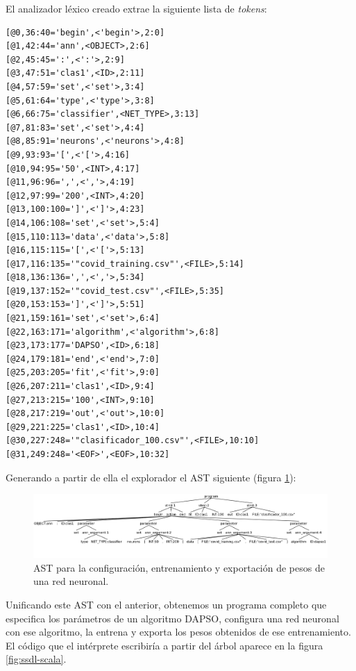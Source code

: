 El analizador léxico creado extrae la siguiente lista de \textit{tokens}:
\vspace{10pt}
\begin{lstlisting}[numbers=none]
[@0,36:40='begin',<'begin'>,2:0]
[@1,42:44='ann',<OBJECT>,2:6]
[@2,45:45=':',<':'>,2:9]
[@3,47:51='clas1',<ID>,2:11]
[@4,57:59='set',<'set'>,3:4]
[@5,61:64='type',<'type'>,3:8]
[@6,66:75='classifier',<NET_TYPE>,3:13]
[@7,81:83='set',<'set'>,4:4]
[@8,85:91='neurons',<'neurons'>,4:8]
[@9,93:93='[',<'['>,4:16]
[@10,94:95='50',<INT>,4:17]
[@11,96:96=',',<','>,4:19]
[@12,97:99='200',<INT>,4:20]
[@13,100:100=']',<']'>,4:23]
[@14,106:108='set',<'set'>,5:4]
[@15,110:113='data',<'data'>,5:8]
[@16,115:115='[',<'['>,5:13]
[@17,116:135='"covid_training.csv"',<FILE>,5:14]
[@18,136:136=',',<','>,5:34]
[@19,137:152='"covid_test.csv"',<FILE>,5:35]
[@20,153:153=']',<']'>,5:51]
[@21,159:161='set',<'set'>,6:4]
[@22,163:171='algorithm',<'algorithm'>,6:8]
[@23,173:177='DAPSO',<ID>,6:18]
[@24,179:181='end',<'end'>,7:0]
[@25,203:205='fit',<'fit'>,9:0]
[@26,207:211='clas1',<ID>,9:4]
[@27,213:215='100',<INT>,9:10]
[@28,217:219='out',<'out'>,10:0]
[@29,221:225='clas1',<ID>,10:4]
[@30,227:248='"clasificador_100.csv"',<FILE>,10:10]
[@31,249:248='<EOF>',<EOF>,10:32]
\end{lstlisting}

Generando a partir de ella el explorador el AST siguiente (figura \ref{fig:ann-ast}):

\begin{figure}[ht!]
    \centering
    \includegraphics[width=1\linewidth]{img/ann_ast.png}
    \caption{AST para la configuración, entrenamiento y exportación de pesos de una red neuronal.}
    \label{fig:ann-ast}
\end{figure}

Unificando este AST con el anterior, obtenemos un programa completo que especifica los parámetros de un algoritmo DAPSO,
configura una red neuronal con ese algoritmo, la entrena y exporta los pesos obtenidos de ese entrenamiento. El código que
el intérprete escribiría a partir del árbol aparece en la figura \ref{fig:ssdl-scala}.

